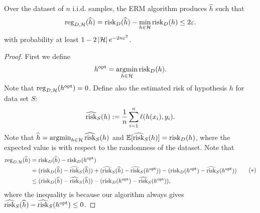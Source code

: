 \documentclass[a4paper]{article}
\begin{document}
\begin{thm}
  Over the dataset of $n$ i.i.d. samples, the ERM algorithm
  produces $\hat{h}$ such that 
  \[
  \operatorname{reg}_{D, \mathcal{H}} (\widehat{h}) 
  = \operatorname{risk}_D (\widehat{h}) - \min_{h \in \mathcal{H}} 
  \operatorname{risk}_D (h) 
  \leq 2 \varepsilon.
  \]
  with probability at least $1 - 2 \left\lvert \mathcal{H}\right\rvert e^{- 2
  n \varepsilon^2}$.
\end{thm}

\begin{proof}
{
  \newcommand{\hopt}{h^{\text{opt}}}
  First we define
  \[
    \hopt = \argmin_{h \in \hcal} \risk_D (h).
  \]
  Note that $\reg_{D, \hcal}(\hopt) = 0$. Define also the 
  estimated risk of hypothesis $h$ for data set $S$:
  \[
  \widehat{\operatorname{risk}}_S (h) := \frac{1}{n} \sum_{i=1}^n \ell(h(x_i),
  y_i).
  \]
  Note that $\widehat{h} = \operatorname*{argmin}_{h \in \mathcal{H}} 
  \widehat{\operatorname{risk}}_S (h)$ and $\mathbb{E}[\widehat{\operatorname{risk}}_S (h)] = 
  \operatorname{risk}_D(h)$, where the expected value is with respect to 
  the randomness of the dataset. Note that 
  \begin{equation*}
    \begin{aligned}
      \reg_{D, \hcal} (\hat{h}) 
      &= \risk_D (\hat{h}) - \risk_D (\hopt) \\
      &= (\risk_D (\hat{h}) - \hat{\risk}_S (\hat{h}))
      + (\hat{\risk}_S (\hat{h}) - \hat{\risk}_S (\hopt)) 
      - (\risk_D (\hopt) - \hat{\risk}_S (\hopt))  \\
      &\leq (\risk_D (\hat{h}) - \hat{\risk}_S (\hat{h}))
      - (\risk_D (\hopt) - \hat{\risk}_S (\hopt)),
    \end{aligned}
    \tag{$*$}
    \label{reg}
  \end{equation*}
  where the inequality is because our algorithm
  always gives
  $\hat{\risk}_S (\hat{h}) - \hat{\risk}_S (\hopt) \leq 0$.

}
\end{proof}
\end{document}
